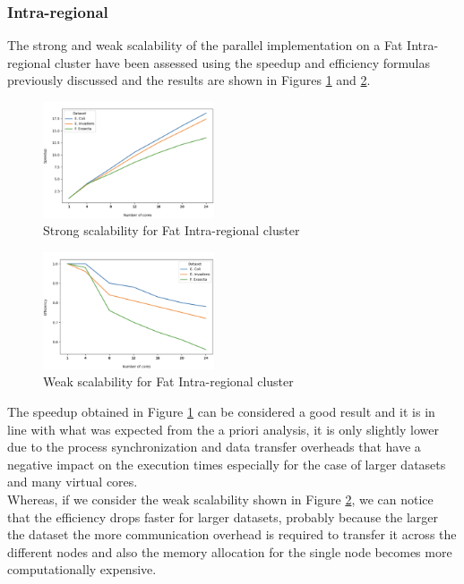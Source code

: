 \documentclass[final,5p,times,twocolumn,authoryear]{elsarticle}
\begin{document}
\subsubsection{Intra-regional}
The strong and weak scalability of the parallel implementation on a Fat Intra-regional cluster have been assessed using the speedup and efficiency formulas previously discussed and the results are shown in Figures \ref{fig:fat-intra-strong} and \ref{fig:fat-intra-weak}. \\
\begin{figure}[H]
   \centering
   \includegraphics[width=0.45\textwidth]{images/fat_intra_strong.png}
   \caption{Strong scalability for Fat Intra-regional cluster }
   \label{fig:fat-intra-strong}
\end{figure}
\begin{figure}[H]
   \centering
   \includegraphics[width=0.45\textwidth]{images/fat_intra_weak.png}
   \caption{Weak scalability for Fat Intra-regional cluster }
   \label{fig:fat-intra-weak}
\end{figure}
The speedup obtained in Figure \ref{fig:fat-intra-strong} can be considered a good result and it is in line with what was expected from the a priori analysis, it is only slightly lower due to the process synchronization and data transfer overheads that have a negative impact on the execution times especially for the case of larger datasets and many virtual cores. \\
Whereas, if we consider the weak scalability shown in Figure \ref{fig:fat-intra-weak}, we can notice that the efficiency drops faster for larger datasets, probably because the larger the dataset the more communication overhead is required to transfer it across the different nodes and also the memory allocation for the single node becomes more computationally expensive. 
\end{document}
